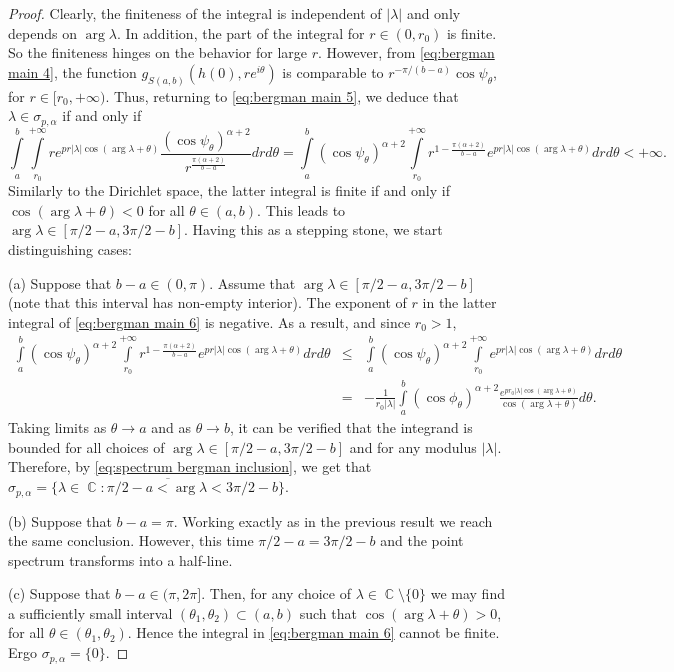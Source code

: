 \documentclass[11pt]{amsart}
\numberwithin{equation}{section}
\theoremstyle{definition}
\DeclareMathOperator{\C}{\mathbb{C}}
\begin{document}
\begin{proof}
		Clearly, the finiteness of the integral is independent of $|\lambda|$ and only depends on $\arg\lambda$. In addition, the part of the integral for $r\in(0,r_0)$ is finite. So the finiteness hinges on the behavior for large $r$. However, from \eqref{eq:bergman main 4}, the function $g_{S(a,b)}(h(0),re^{i\theta})$ is comparable to $r^{-\pi/(b-a)}\cos\psi_\theta$, for $r\in[r_0,+\infty)$. Thus, returning to \eqref{eq:bergman main 5}, we deduce that $\lambda\in\sigma_{p,\alpha}$ if and only if
		\begin{equation}\label{eq:bergman main 6}
			\int\limits_{a}^{b}\int\limits_{r_0}^{+\infty}re^{pr|\lambda|\cos(\arg\lambda+\theta)}\dfrac{(\cos\psi_\theta)^{\alpha+2}}{r^{\frac{\pi(\alpha+2)}{b-a}}}drd\theta=\int\limits_{a}^{b}(\cos\psi_\theta)^{\alpha+2}\int\limits_{r_0}^{+\infty}r^{1-\frac{\pi(\alpha+2)}{b-a}}e^{pr|\lambda|\cos(\arg\lambda+\theta)}drd\theta<+\infty.
		\end{equation}
		Similarly to the Dirichlet space, the latter integral is finite if and only if $\cos(\arg\lambda+\theta)<0$ for all $\theta\in(a,b)$. This leads to $\arg\lambda\in[\pi/2-a,3\pi/2-b]$. Having this as a stepping stone, we start distinguishing cases:
		
		(a) Suppose that $b-a\in(0,\pi)$. Assume that $\arg \lambda \in[\pi/2-a,3\pi/2-b]$ (note that this interval has non-empty interior). The exponent of $r$ in the latter integral of \eqref{eq:bergman main 6} is negative. As a result, and since $r_0>1$,
		\begin{eqnarray*}
			\int\limits_{a}^{b}(\cos\psi_\theta)^{\alpha+2}\int\limits_{r_0}^{+\infty}r^{1-\frac{\pi(\alpha+2)}{b-a}}e^{pr|\lambda|\cos(\arg\lambda+\theta)}drd\theta &\le& \int\limits_{a}^{b}(\cos\psi_\theta)^{\alpha+2}\int\limits_{r_0}^{+\infty}e^{pr|\lambda|\cos(\arg\lambda+\theta)}drd\theta\\
			&=&-\frac{1}{r_0|\lambda|}\int\limits_{a}^{b}(\cos\phi_\theta)^{\alpha+2}\frac{e^{pr_0|\lambda|\cos(\arg\lambda+\theta)}}{\cos(\arg\lambda+\theta)}d\theta.
		\end{eqnarray*}
		Taking limits as $\theta\to a$ and as $\theta\to b$, it can be verified that the integrand is bounded for all choices of $\arg\lambda\in[\pi/2-a,3\pi/2-b]$ and for any modulus $|\lambda|$. Therefore, by \eqref{eq:spectrum bergman inclusion}, we get that $\sigma_{p,\alpha}=\overline{\{\lambda\in\C:\pi/2-a <\arg\lambda <3\pi/2-b\}}$.
		
		(b) Suppose that $b-a=\pi$. Working exactly as in the previous result we reach the same conclusion. However, this time $\pi/2-a=3\pi/2-b$ and the point spectrum transforms into a half-line.
		
		(c) Suppose that $b-a\in(\pi,2\pi]$. Then, for any choice of $\lambda\in\C\setminus\{0\}$ we may find a sufficiently small interval $(\theta_1,\theta_2)\subset(a,b)$ such that $\cos(\arg\lambda+\theta)>0$, for all $\theta\in(\theta_1,\theta_2)$. Hence the integral in \eqref{eq:bergman main 6} cannot be finite. Ergo $\sigma_{p,\alpha}=\{0\}$.
	\end{proof}
	
\end{document}
